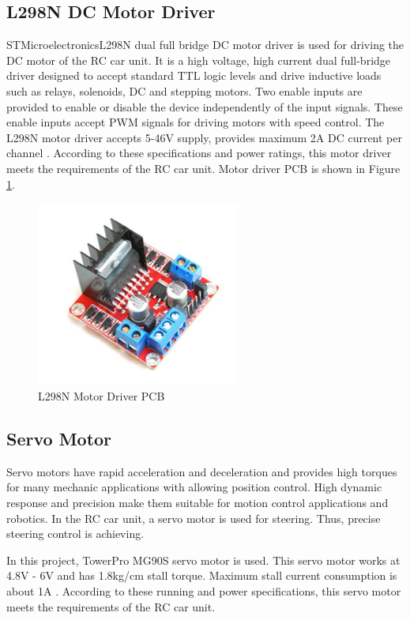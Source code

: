 \subsection{L298N DC Motor Driver} \label{sec_l298n_driver}
STMicroelectronics\texttrademark\;L298N dual full bridge DC motor driver is used for driving the DC motor of the RC car unit. It is a high voltage, high current dual full-bridge driver designed to accept standard TTL logic levels and drive inductive loads such as relays, solenoids, DC and stepping motors. Two enable inputs are provided to enable or disable the device independently of the input signals. These enable inputs accept PWM signals for driving motors with speed control. The L298N motor driver accepts 5-46V supply, provides maximum 2A DC current per channel \cite{Two}. According to these specifications and power ratings, this motor driver meets the requirements of the RC car unit. Motor driver PCB is shown in Figure \ref{fig:l298n_pcb}.

\begin{figure}[!htbp]
    \centering
    \includegraphics[width=0.6\textwidth]{Imgs/l298n.png}
    \caption{\label{fig:l298n_pcb}L298N Motor Driver PCB}
\end{figure}

\subsection{Servo Motor}
Servo motors have rapid acceleration and deceleration and provides high torques for many mechanic applications with allowing position control. High dynamic response and precision make them suitable for motion control applications and robotics. In the RC car unit, a servo motor is used for steering. Thus, precise steering control is achieving.

In this project, TowerPro\texttrademark\; MG90S servo motor is used. This servo motor works at 4.8V - 6V and has 1.8kg/cm stall torque. Maximum stall current consumption is about 1A \cite{Ref_servo_mg90s}. According to these running and power specifications, this servo motor meets the requirements of the RC car unit.

